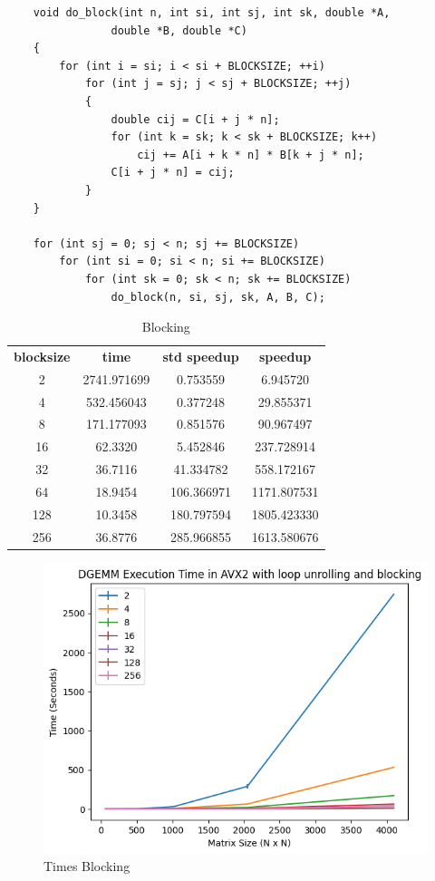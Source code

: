 \documentclass[12pt]{article}
\begin{document}
\begin{lstlisting}
    void do_block(int n, int si, int sj, int sk, double *A, 
                double *B, double *C)
    {
        for (int i = si; i < si + BLOCKSIZE; ++i)
            for (int j = sj; j < sj + BLOCKSIZE; ++j)
            {
                double cij = C[i + j * n];
                for (int k = sk; k < sk + BLOCKSIZE; k++)
                    cij += A[i + k * n] * B[k + j * n];
                C[i + j * n] = cij;
            }
    }

    for (int sj = 0; sj < n; sj += BLOCKSIZE)
        for (int si = 0; si < n; si += BLOCKSIZE)
            for (int sk = 0; sk < n; sk += BLOCKSIZE)
                do_block(n, si, sj, sk, A, B, C);
\end{lstlisting}

\begin{table}[h]
    \centering
    \label{tab:blocking}
    \begin{tabular}{cccc}
        \textbf{blocksize} & \textbf{time} & \textbf{std speedup} & \textbf{speedup} \\
        2 & 2741.971699 & 0.753559	& 6.945720 \\
        4 & 532.456043 & 0.377248	&29.855371 \\
        8 & 171.177093	 & 0.851576	&90.967497 \\
        16 & 62.3320 & 5.452846	&237.728914 \\
        32 & 36.7116 & 41.334782	&558.172167 \\
        64 & 18.9454 & 106.366971&	1171.807531\\
        128 & 10.3458 & 180.797594&	1805.423330\\
        256 & 36.8776 & 285.966855&	1613.580676\\
    \end{tabular}
    \caption{Blocking}
\end{table}

\begin{figure}[h]
    \centering
    \includegraphics[scale=0.6]{figures/times_blocking.png}
    \caption{Times Blocking}
    \label{fig:times-blocking}
\end{figure}
\end{document}
